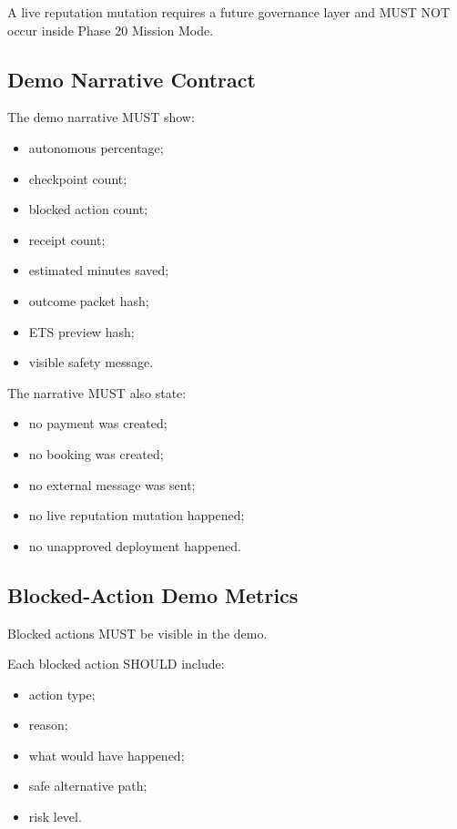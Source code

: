 A live reputation mutation requires a future governance layer and MUST NOT occur inside Phase 20 Mission Mode.

\subsection{Demo Narrative Contract}

The demo narrative MUST show:

\begin{itemize}
  \item autonomous percentage;
  \item checkpoint count;
  \item blocked action count;
  \item receipt count;
  \item estimated minutes saved;
  \item outcome packet hash;
  \item ETS preview hash;
  \item visible safety message.
\end{itemize}

The narrative MUST also state:

\begin{itemize}
  \item no payment was created;
  \item no booking was created;
  \item no external message was sent;
  \item no live reputation mutation happened;
  \item no unapproved deployment happened.
\end{itemize}

\subsection{Blocked-Action Demo Metrics}

Blocked actions MUST be visible in the demo.

Each blocked action SHOULD include:

\begin{itemize}
  \item action type;
  \item reason;
  \item what would have happened;
  \item safe alternative path;
  \item risk level.
\end{itemize}

